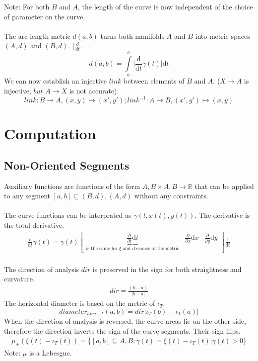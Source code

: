 \documentclass{report}
\begin{document}
Note: For both $B$ and $A$, the length of the curve is now independent of the choice of parameter on the curve. ~\cite[]{Taimanov}\\\\
The arc-length metric $d(a,b)$ turns both manifolds $A$ and $B$ into metric spaces $(A,d)$ and $(B,d)$. ($\frac{d}{dt}$. ~\cite[.3]{Klingenberg}
\begin{equation}
d(a,b) = \int \limits _{a}^{b}\lvert \frac{\mathrm{d}}{\mathrm{d}t}\gamma(t)\rvert \mathrm{d}t
\end{equation}
We can now establish an injective $link$ between elements of $B$ and $A$. ($X \rightarrow A$ is injective, $but$ $A \rightarrow X$ is not accurate):
\begin{equation}
link: B \rightarrow A, (x,y) \mapsto (x',y'); link^{-1}: A \rightarrow B, (x',y') \mapsto (x,y)
\end{equation}

\chapter{Computation}

\section{Non-Oriented Segments}
Auxiliary functions are functions of the form $A,B \times A,B \rightarrow \mathbb{R}$ that can be applied to any segment $[a,b] \subseteq (B,d),(A,d)$ without any constraints.\\\\
The curve functions can be interprated as $\gamma(t,x(t),y(t))$. The derivative is the total derivative.
\begin{align}
\frac{\mathrm{d}}{\mathrm{d} t} \gamma (t) = \gamma(t) \begin{bmatrix} \underbrace{\frac{\partial}{\partial t} \mathrm{d} t}_{\text{is the same for } \xi \text{ and } \iota \text{because of the metric}} & \frac{\partial}{\partial x}  \mathrm{d} x & \frac{\partial}{\partial y} \mathrm{d} y \end{bmatrix} \frac{1}{\mathrm{d}t}
\end{align}\\
The direction of analysis $dir$ is preserved in the sign for both straightness and curvature.
\begin{align}
dir = \frac{(b-a)}{\lvert b-a \rvert}
\end{align}
The horizontal diameter is based on the metric of $\iota_{T}$.
\begin{equation}
diameter_{horiz,T}(a,b)= dir \lvert \iota_{T}(b) - \iota_{T}(a) \rvert
\end{equation}
When the direction of analysis is reversed, the curve areas lie on the other side, therefore the direction inverts the sign of the curve segments. Their sign flips.
\begin{align}
\mu_{+}(\xi(t) -\iota_{T}(t))=\{[a,b] \subseteq A,B; \gamma(t)=\xi(t) -\iota_{T}(t) \vert \gamma(t)>0\}
\end{align}
Note: $\mu$ is a Lebesgue.
\end{document}
